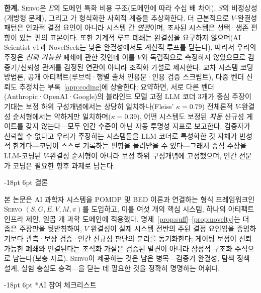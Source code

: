 \documentclass[11pt]{article}
\makeatletter
\renewcommand\section{\@startsection{section}{1}{\z@}%
  {-18pt \@plus -4pt \@minus -2pt}%
  {6pt \@plus 2pt}%
  {\normalfont\large\bfseries}}
\newcommand{\sgmvpi}{$(S, G, E, V, M, \pi)$}
\newcommand{\framework}{\textsc{Servo}}
\makeatother
\begin{document}
\textbf{한계.} \framework{}은 $E$의 도메인 특화 비용 구조(도메인에 따라 수십 배 차이), $S$의 비정상성(개방형 문제), 그리고 \citet{taniguchi2024cpc}가 형식화한 사회적 계층을 추상화한다. 더 근본적으로 $V$-완결성 패턴은 인과적 결정 요인이 아니라 시스템 간 \emph{연관}이며, 조사된 시스템은 선택·생존 편향이 있는 편의 표본이다. 또한 기계적 루프 폐쇄는 완결성을 요구하지 않으며(AI Scientist v1과 NovelSeek는 낮은 완결성에서도 계산적 루프를 닫는다), 따라서 우리의 주장은 \emph{신뢰 가능한} 폐쇄에 관한 것인데 이를 $V$와 독립적으로 측정하지 않았으므로 검증기/신뢰성 관계를 검정된 연관이 아니라 조직화 가설로 제시한다. 교차 시스템 코딩 방법론, 공개 아티팩트(루브릭·행별 출처 인용문·인용 검증 스크립트), 다중 벤더 신뢰도 추정치는 부록~\ref{app:coding}에 상술한다; 요약하면, 서로 다른 벤더(Anthropic·OpenAI·Google)의 블라인드 모델 고정 LLM 코더 3개가 중심 주장이 기대는 보정 하위 구성개념에서는 상당히 일치하나(Fleiss' $\kappa{=}0.79$) 전체론적 $V$-완결성 순서형에서는 약하게만 일치하며($\kappa{=}0.39$), 어떤 시스템도 보정된 \emph{자동} 신규성 게이트를 갖지 않는다---모두 인간 수준이 아닌 자동 투명성 지표로 보고한다. 검증자가 신뢰할 수 없다고 우리가 주장하는 시스템들을 LLM 코더로 특성화한 것 자체가 반성적 한계다---코딩이 스스로 기록하는 편향을 물려받을 수 있다---그래서 중심 주장을 LLM-코딩된 $V$-완결성 순서형이 아니라 보정 하위 구성개념에 고정했으며, 인간 전문가 코딩은 필요한 향후 과제로 남는다.

\section{결론}
\label{sec:conclusion}

본 논문은 AI 과학자 시스템을 POMDP 및 BED 이론과 연결하는 형식 프레임워크인 \framework{} \sgmvpi{}를 도입하고, 이를 여섯 개의 핵심 시스템, 하나의 아티팩트 인프라 제안, 일곱 개 과학 도메인에 적용했다. 명제~\ref{prop:suff}--\ref{prop:novelty}는 더 좁은 주장만을 뒷받침하여, $V$ 완결성이 실제 시스템 전반의 주된 결정 요인임을 증명하기보다 관측·보상 검증·인간 신규성 판단의 분리를 동기화한다; 게이팅 보정이 신뢰 가능한 폐쇄와 연결된다는 조직화 가설은 검증된 발견이 아니라 잠정적 구조화 주석으로 남는다(보충 자료). \framework{}이 제공하는 것은 남은 병목---검증기 완결성, 탐색 정책 설계, 실험 충실도 승격---을 닫는 데 필요한 것을 정확히 명명하는 어휘다.




\newpage
\section*{AI 참여 체크리스트}
\label{sec:ai-checklist}
\end{document}
